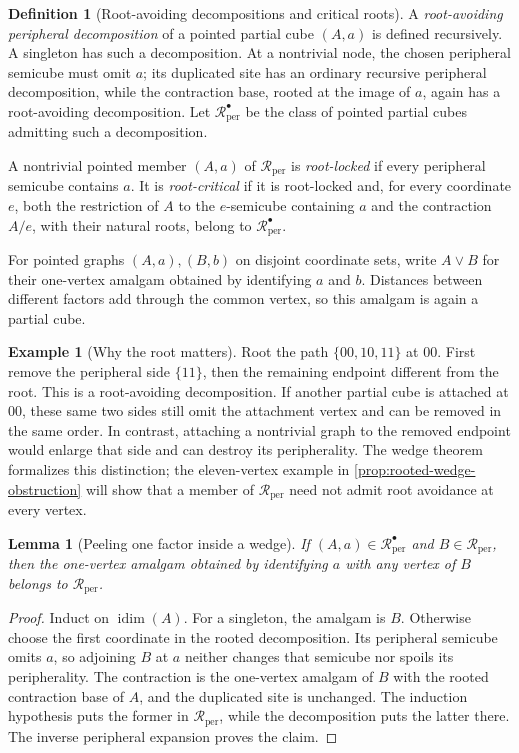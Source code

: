 \documentclass[11pt]{article}
\newtheorem{lemma}[theorem]{Lemma}
\theoremstyle{definition}
\newtheorem{definition}[theorem]{Definition}
\newtheorem{example}[theorem]{Example}
\theoremstyle{remark}
\newcommand{\Rper}{\mathcal R_{\mathrm{per}}}
\newcommand{\Rbullet}{\mathcal R_{\mathrm{per}}^{\bullet}}
\newcommand{\idim}{\operatorname{idim}}
\begin{document}
\begin{definition}[Root-avoiding decompositions and critical roots]
\label{def:rooted}
A \emph{root-avoiding peripheral decomposition} of a pointed partial cube
\((A,a)\) is defined recursively.  A singleton has such a decomposition.  At
a nontrivial node, the chosen peripheral semicube must omit \(a\); its
duplicated site has an ordinary recursive peripheral decomposition, while the
contraction base, rooted at the image of \(a\), again has a root-avoiding
decomposition.
Let \(\Rbullet\) be the class of pointed partial cubes admitting such a
decomposition.

A nontrivial pointed member \((A,a)\) of \(\Rper\) is \emph{root-locked} if
every peripheral semicube contains \(a\).  It is \emph{root-critical} if it
is root-locked and, for every coordinate \(e\), both the restriction of
\(A\) to the \(e\)-semicube containing \(a\) and the contraction \(A/e\),
with their natural roots, belong to \(\Rbullet\).
\end{definition}

For pointed graphs \((A,a),(B,b)\) on disjoint coordinate sets, write
\(A\vee B\) for their one-vertex amalgam obtained by identifying \(a\) and
\(b\).  Distances between different factors add through the common vertex,
so this amalgam is again a partial cube.

\begin{example}[Why the root matters]
\label{ex:rooted-path}
Root the path \(\{00,10,11\}\) at \(00\). First remove the peripheral
side \(\{11\}\), then the remaining endpoint different from the root.
This is a root-avoiding decomposition. If another partial cube is attached
at \(00\), these same two sides still omit the attachment vertex and can
be removed in the same order. In contrast, attaching a nontrivial graph to
the removed endpoint would enlarge that side and can destroy its
peripherality. The wedge theorem formalizes this distinction; the
eleven-vertex example in \cref{prop:rooted-wedge-obstruction} will show that
a member of \(\Rper\) need not admit root avoidance at every vertex.
\end{example}

\begin{lemma}[Peeling one factor inside a wedge]
\label{lem:rooted-amalgam}
If \((A,a)\in\Rbullet\) and \(B\in\Rper\), then the one-vertex amalgam
obtained by identifying \(a\) with any vertex of \(B\) belongs to \(\Rper\).
\end{lemma}

\begin{proof}
Induct on \(\idim(A)\).  For a singleton, the amalgam is \(B\).  Otherwise
choose the first coordinate in the rooted decomposition.  Its peripheral
semicube omits \(a\), so adjoining \(B\) at \(a\) neither changes that
semicube nor spoils its peripherality.  The contraction is the one-vertex
amalgam of \(B\) with the rooted contraction base of \(A\), and the
duplicated site is unchanged.  The induction hypothesis puts the former in
\(\Rper\), while the decomposition puts the latter there.  The inverse
peripheral expansion proves the claim.
\end{proof}
\end{document}
